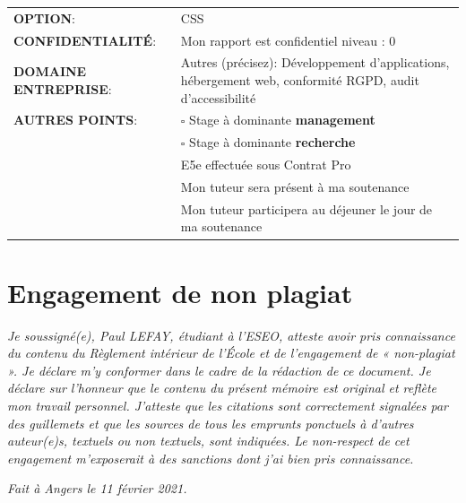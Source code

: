 \documentclass[12pt, a4paper, twoside]{article}
\begin{document}
\begin{center}
	\begin{tabular}{ m{5cm} m{11.5cm} }
	\textbf{OPTION}: &  \mbox{\ooalign{$\checkmark$\cr\hidewidth$\square$\hidewidth\cr}} CSS  \\
    \textbf{CONFIDENTIALITÉ}:  & Mon rapport est confidentiel niveau : \mbox{\ooalign{$\checkmark$\cr\hidewidth$\square$\hidewidth\cr}} 0 \\
    \textbf{DOMAINE ENTREPRISE}: & \mbox{\ooalign{$\checkmark$\cr\hidewidth$\square$\hidewidth\cr}} Autres (précisez): Développement d'applications, hébergement web, conformité RGPD, audit d'accessibilité \\
    \textbf{AUTRES POINTS}: &  $\square$ Stage à dominante \textbf{management} \\
                             &  $\square$ Stage à dominante \textbf{recherche} \\
                             & \mbox{\ooalign{$\checkmark$\cr\hidewidth$\square$\hidewidth\cr}} E5e effectuée sous Contrat Pro \\
                             &  \mbox{\ooalign{$\checkmark$\cr\hidewidth$\square$\hidewidth\cr}} Mon tuteur sera présent à ma soutenance \\
                             &  \mbox{\ooalign{$\checkmark$\cr\hidewidth$\square$\hidewidth\cr}} Mon tuteur participera au déjeuner le jour de ma soutenance \\
\end{tabular}
\end{center}

\newpage

\section*{Engagement de non plagiat}
\textit{Je soussigné(e), Paul LEFAY, étudiant à l'\gls{ESEO}, atteste avoir pris connaissance du contenu du Règlement intérieur de l'École et de l'engagement de « non-plagiat ». 
Je déclare m'y conformer dans le cadre de la rédaction de ce document. 
Je déclare sur l'honneur que le contenu du présent mémoire est original et reflète mon travail personnel. 
J'atteste que les citations sont correctement signalées par des guillemets et que les sources de tous les emprunts ponctuels à d'autres auteur(e)s, textuels ou non textuels, sont indiquées. 
Le non-respect de cet engagement m'exposerait à des sanctions dont j'ai bien pris connaissance.}

\textit{Fait à Angers le 11 février 2021.}
\end{document}
